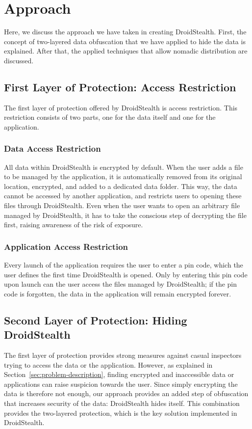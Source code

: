 \section{Approach}
\label{sec:approach}
Here, we discuss the approach we have taken in creating DroidStealth. 
First, the concept of two-layered data obfuscation that we have applied to hide the data is explained.
After that, the applied techniques that allow nomadic distribution are discussed.


\subsection{First Layer of Protection: Access Restriction}
The first layer of protection offered by DroidStealth is access restriction.
This restriction consists of two parts, one for the data itself and one for the application.

\subsubsection{Data Access Restriction}
All data within DroidStealth is encrypted by default.
When the user adds a file to be managed by the application, it is automatically removed from its original location, encrypted, and added to a dedicated data folder.
This way, the data cannot be accessed by another application, and restricts users to opening these files through DroidStealth.
Even when the user wants to open an arbitrary file managed by DroidStealth, it has to take the conscious step of decrypting the file first, raising awareness of the risk of exposure.

\subsubsection{Application Access Restriction}
Every launch of the application requires the user to enter a pin code, which the user defines the first time DroidStealth is opened.
Only by entering this pin code upon launch can the user access the files managed by DroidStealth; if the pin code is forgotten, the data in the application will remain encrypted forever.

\subsection{Second Layer of Protection: Hiding DroidStealth}
The first layer of protection provides strong measures against casual inspectors trying to access the data or the application.
However, as explained in Section~\ref{sec:problem-description}, finding encrypted and inaccessible data or applications can raise suspicion towards the user.
Since simply encrypting the data is therefore not enough, our approach provides an added step of obfuscation that increases security of the data: DroidStealth hides itself.
This combination provides the two-layered protection, which is the key solution implemented in DroidStealth.


